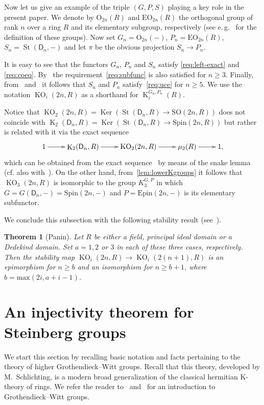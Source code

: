 \documentclass[oneside, 8pt]{amsart}
\newtheorem{externaltheorem}[lemma]{Theorem}
\theoremstyle{remark}
\theoremstyle{definition}
\numberwithin{lemma}{section}
\numberwithin{prop}{section}
\numberwithin{corollary}{section}
\numberwithin{externaltheorem}{section}
\DeclareMathOperator{\Ker}{Ker}
\DeclareMathOperator{\St}{St}
\DeclareMathOperator{\K}{K}
\DeclareMathOperator{\KO}{KO}
\newcommand{\rD}{\mathsf{D}}
\numberwithin{equation}{section}
\begin{document}
Now let us give an example of the triple $(G, P, S)$ playing a key role in the present paper.
We denote by $\mathrm{O}_{2n}(R)$ and $\mathrm{EO}_{2n}(R)$ the orthogonal group of rank $n$ over a ring $R$ and its elementary subgroup, respectively
 (see e.\,g.~\cite{Su82} for the definition of these groups).
Now set $G_n = \mathrm{O}_{2n}(-)$, $P_n = \mathrm{EO}_{2n}(R)$, $S_n = \St(\rD_n, -)$ and let $\pi$ be the obvious projection $S_n \to P_n$.

It is easy to see that the functors $G_n$, $P_n$ and $S_n$ satisfy \ref{req:left-exact} and \ref{req:coeq}.
By~\cite{Su82} the requirement~\ref{req:subfunc} is also satisfied for $n \geq 3$.
Finally, from~\cite[Corollary~5.4]{St71} and~\cite[Theorem~1]{LS17} it follows that $S_n$ and $P_n$ satisfy~\ref{req:uce} for $n \geq 5$.
We use the notation $\KO_i(2n, R)$ as a shorthand for $\K_i^{G_n, P_n}(R)$. 

Notice that $\KO_2(2n, R) = \Ker(\St(\rD_n, R) \to \mathrm{SO}(2n, R))$ does not coincide with $\K_2(\rD_n, R) = \Ker(\St(\rD_n, R) \to \mathrm{Spin}(2n, R))$ but rather is related with it via the exact sequence
\[ \xymatrix{ 1 \ar[r] & \K_2(\rD_n, R) \ar[r] & \KO_2(2n, R) \ar[r] & \mu_2(R) \ar[r] & 1,} \]
which can be obtained from the exact sequence~\cite[p.~189]{Ba74} by means of the snake lemma (cf. also with~\cite[Corollary~4.3.5]{Ba74}).
On the other hand, from~\cref{lem:lowerKgroups} it follows that $\KO_3(2n, R)$ is isomorphic to the group $K_3^{G, P}$ in which $G = G(\rD_n, -) = \mathrm{Spin}(2n, -)$ and $P = \mathrm{Epin}(2n, -)$ is its elementary subfunctor.

We conclude this subsection with the following stability result (see~\cite[Theorem~9.4]{Pa89}).
\begin{externaltheorem}[Panin] \label{Panin-stability}
 Let $R$ be either a field, principal ideal domain or a Dedekind domain. Set $a = 1,2$ or $3$ in each of these three cases, respectively.
 Then the stability map $\KO_i(2n, R) \to \KO_i(2(n+1), R)$ is an epimorphism for $n \geq b$ 
 and an isomorphism for $n \geq b + 1$, where $b = \mathrm{max}(2i, a+i-1)$. \end{externaltheorem}

\section{An injectivity theorem for Steinberg groups} \label{firstPart}
We start this section by recalling basic notation and facts pertaining to the theory of higher Grothendieck--Witt groups. Recall that this theory, developed by M.~Schlichting, is a modern broad generalization of the classical hermitian K-theory of rings. We refer the reader to~\cite[\S~2]{FRS12} and~\cite[\S~2]{AF17} for an introduction to Grothendieck--Witt groups.
\end{document}
